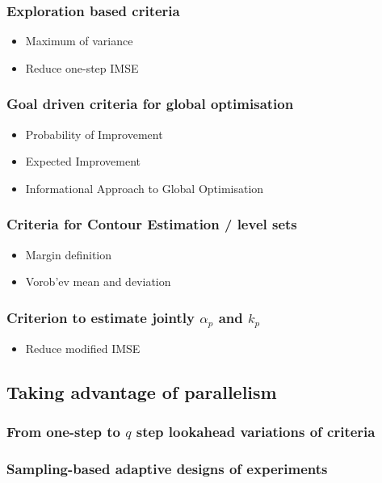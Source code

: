 \documentclass[11pt]{article}
\begin{document}
\subsubsection{Exploration based criteria}
\label{sec:orged7eafd}
\begin{itemize}
\item Maximum of variance
\item Reduce one-step IMSE
\end{itemize}
\subsubsection{Goal driven criteria for global optimisation}
\label{sec:org807d423}
\begin{itemize}
\item Probability of Improvement
\item Expected Improvement
\item Informational Approach to Global Optimisation
\end{itemize}
\subsubsection{Criteria for Contour Estimation / level sets}
\label{sec:orge939159}
\begin{itemize}
\item Margin definition
\item Vorob'ev mean and deviation
\end{itemize}
\subsubsection{Criterion to estimate jointly \(\alpha_p\) and \(k_p\)}
\label{sec:orga17b85a}
\begin{itemize}
\item Reduce modified IMSE
\end{itemize}
\subsection{Taking advantage of parallelism}
\label{sec:org9fe350a}
\subsubsection{From one-step to \(q\) step lookahead variations of criteria}
\label{sec:org125138f}
\subsubsection{Sampling-based adaptive designs of experiments}
\label{sec:orgb1deed5}
\end{document}
